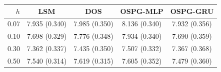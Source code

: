 \begin{tabular}{rcccc}
\toprule
$h$ & LSM & DOS & OSPG-MLP & OSPG-GRU \\
\midrule
0.07 & 7.935 (0.340) & 7.985 (0.350) & 8.136 (0.340) & 7.932 (0.356) \\
0.10 & 7.698 (0.329) & 7.776 (0.348) & 7.934 (0.340) & 7.690 (0.359) \\
0.30 & 7.362 (0.337) & 7.435 (0.350) & 7.507 (0.332) & 7.367 (0.368) \\
0.50 & 7.540 (0.314) & 7.619 (0.315) & 7.605 (0.352) & 7.479 (0.360) \\
\bottomrule
\end{tabular}
